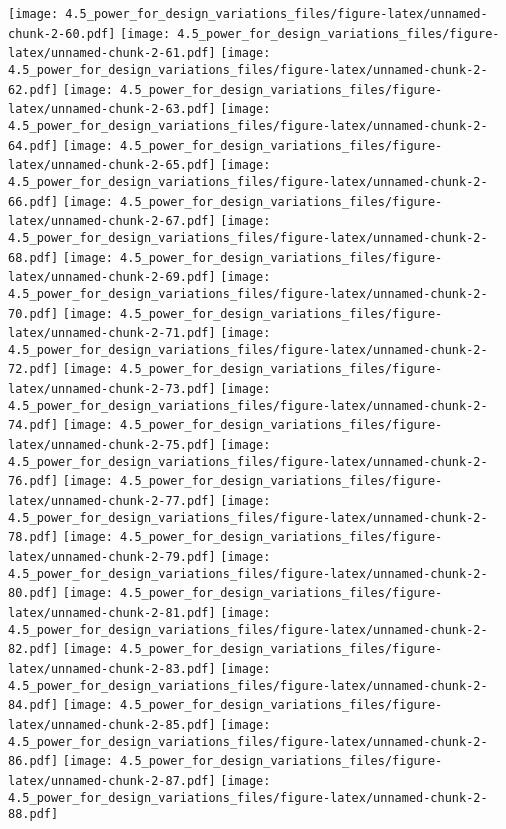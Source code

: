 \documentclass[]{article}
\begin{document}
\texttt{[image: 4.5\_power\_for\_design\_variations\_files/figure-latex/unnamed-chunk-2-60.pdf]}
\texttt{[image: 4.5\_power\_for\_design\_variations\_files/figure-latex/unnamed-chunk-2-61.pdf]}
\texttt{[image: 4.5\_power\_for\_design\_variations\_files/figure-latex/unnamed-chunk-2-62.pdf]}
\texttt{[image: 4.5\_power\_for\_design\_variations\_files/figure-latex/unnamed-chunk-2-63.pdf]}
\texttt{[image: 4.5\_power\_for\_design\_variations\_files/figure-latex/unnamed-chunk-2-64.pdf]}
\texttt{[image: 4.5\_power\_for\_design\_variations\_files/figure-latex/unnamed-chunk-2-65.pdf]}
\texttt{[image: 4.5\_power\_for\_design\_variations\_files/figure-latex/unnamed-chunk-2-66.pdf]}
\texttt{[image: 4.5\_power\_for\_design\_variations\_files/figure-latex/unnamed-chunk-2-67.pdf]}
\texttt{[image: 4.5\_power\_for\_design\_variations\_files/figure-latex/unnamed-chunk-2-68.pdf]}
\texttt{[image: 4.5\_power\_for\_design\_variations\_files/figure-latex/unnamed-chunk-2-69.pdf]}
\texttt{[image: 4.5\_power\_for\_design\_variations\_files/figure-latex/unnamed-chunk-2-70.pdf]}
\texttt{[image: 4.5\_power\_for\_design\_variations\_files/figure-latex/unnamed-chunk-2-71.pdf]}
\texttt{[image: 4.5\_power\_for\_design\_variations\_files/figure-latex/unnamed-chunk-2-72.pdf]}
\texttt{[image: 4.5\_power\_for\_design\_variations\_files/figure-latex/unnamed-chunk-2-73.pdf]}
\texttt{[image: 4.5\_power\_for\_design\_variations\_files/figure-latex/unnamed-chunk-2-74.pdf]}
\texttt{[image: 4.5\_power\_for\_design\_variations\_files/figure-latex/unnamed-chunk-2-75.pdf]}
\texttt{[image: 4.5\_power\_for\_design\_variations\_files/figure-latex/unnamed-chunk-2-76.pdf]}
\texttt{[image: 4.5\_power\_for\_design\_variations\_files/figure-latex/unnamed-chunk-2-77.pdf]}
\texttt{[image: 4.5\_power\_for\_design\_variations\_files/figure-latex/unnamed-chunk-2-78.pdf]}
\texttt{[image: 4.5\_power\_for\_design\_variations\_files/figure-latex/unnamed-chunk-2-79.pdf]}
\texttt{[image: 4.5\_power\_for\_design\_variations\_files/figure-latex/unnamed-chunk-2-80.pdf]}
\texttt{[image: 4.5\_power\_for\_design\_variations\_files/figure-latex/unnamed-chunk-2-81.pdf]}
\texttt{[image: 4.5\_power\_for\_design\_variations\_files/figure-latex/unnamed-chunk-2-82.pdf]}
\texttt{[image: 4.5\_power\_for\_design\_variations\_files/figure-latex/unnamed-chunk-2-83.pdf]}
\texttt{[image: 4.5\_power\_for\_design\_variations\_files/figure-latex/unnamed-chunk-2-84.pdf]}
\texttt{[image: 4.5\_power\_for\_design\_variations\_files/figure-latex/unnamed-chunk-2-85.pdf]}
\texttt{[image: 4.5\_power\_for\_design\_variations\_files/figure-latex/unnamed-chunk-2-86.pdf]}
\texttt{[image: 4.5\_power\_for\_design\_variations\_files/figure-latex/unnamed-chunk-2-87.pdf]}
\texttt{[image: 4.5\_power\_for\_design\_variations\_files/figure-latex/unnamed-chunk-2-88.pdf]}
\end{document}
